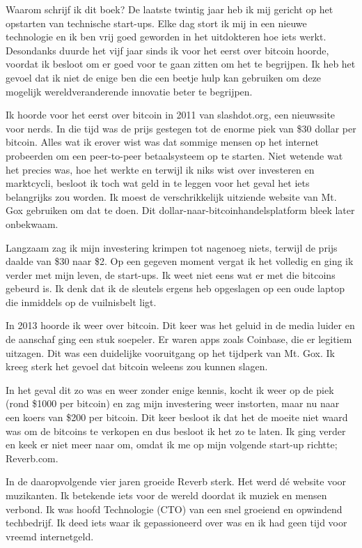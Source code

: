 \documentclass[smalldemyvopaper,11pt,twoside,onecolumn,openright,extrafontsizes]{memoir}
\begin{document}
Waarom schrijf ik dit boek? De laatste twintig jaar heb ik mij gericht op het opstarten van technische start-ups. Elke dag stort ik mij in een nieuwe technologie en ik ben vrij goed geworden in het uitdokteren hoe iets werkt. Desondanks duurde het vijf jaar sinds ik voor het eerst over bitcoin hoorde, voordat ik besloot om er goed voor te gaan zitten om het te begrijpen. Ik heb het gevoel dat ik niet de enige ben die een beetje hulp kan gebruiken om deze mogelijk wereldveranderende innovatie beter te begrijpen.

Ik hoorde voor het eerst over bitcoin in 2011 van \mbox{slashdot.org}, een nieuwssite voor nerds. In die tijd was de prijs gestegen tot de enorme piek van \$30 dollar per bitcoin. Alles wat ik erover wist was dat sommige mensen op het internet probeerden om een peer-to-peer betaalsysteem op te starten. Niet wetende wat het precies was, hoe het werkte en terwijl ik niks wist over investeren en marktcycli, besloot ik toch wat geld in te leggen voor het geval het iets belangrijks zou worden. Ik moest de verschrikkelijk uitziende website van Mt. Gox gebruiken om dat te doen. Dit dollar-naar-bitcoinhandelsplatform bleek later onbekwaam.

Langzaam zag ik mijn investering krimpen tot nagenoeg niets, terwijl de prijs daalde van \$30 naar \$2. Op een gegeven moment vergat ik het volledig en ging ik verder met mijn leven, de start-ups. Ik weet niet eens wat er met die bitcoins gebeurd is. Ik denk dat ik de sleutels ergens heb opgeslagen op een oude laptop die inmiddels op de vuilnisbelt ligt.

In 2013 hoorde ik weer over bitcoin. Dit keer was het geluid in de media luider en de aanschaf ging een stuk soepeler. Er waren apps zoals Coinbase, die er legitiem uitzagen. Dit was een duidelijke vooruitgang op het tijdperk van Mt. Gox. Ik kreeg sterk het gevoel dat bitcoin weleens zou kunnen slagen.

In het geval dit zo was en weer zonder enige kennis, kocht ik weer op de piek (rond \$1000 per bitcoin) en zag mijn investering weer instorten, maar nu naar een koers van \$200 per bitcoin. Dit keer besloot ik dat het de moeite niet waard was om de bitcoins te verkopen en dus besloot ik het zo te laten. Ik ging verder en keek er niet meer naar om, omdat ik me op mijn volgende start-up richtte; Reverb.com. 

In de daaropvolgende vier jaren groeide Reverb sterk. Het werd dé website voor muzikanten. Ik betekende iets voor de wereld doordat ik muziek en mensen verbond. Ik was hoofd Technologie (CTO) van een snel groeiend en opwindend techbedrijf. Ik deed iets waar ik gepassioneerd over was en ik had geen tijd voor vreemd internetgeld.
\end{document}
